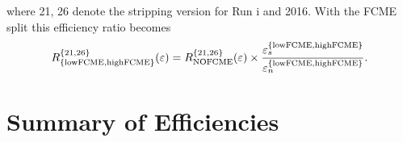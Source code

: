 
\noindent where 21, 26 denote the stripping version for Run \Rn{1} and 2016. With the FCME split this efficiency ratio becomes
\begin{equation}
	R^{\{21,26\}}_{\mathrm{\{lowFCME,highFCME\}}}(\varepsilon)=R_{\rm{NOFCME}}^{\{21,26\}}(\varepsilon)\times\frac{\varepsilon^{\mathrm{\{lowFCME,highFCME\}}}_{s}}{\varepsilon^{\mathrm{\{lowFCME,highFCME\}}}_{n}}.
\label{eq:splitted}
\end{equation}




\section{Summary of Efficiencies}
\label{EfficiencySummary}

